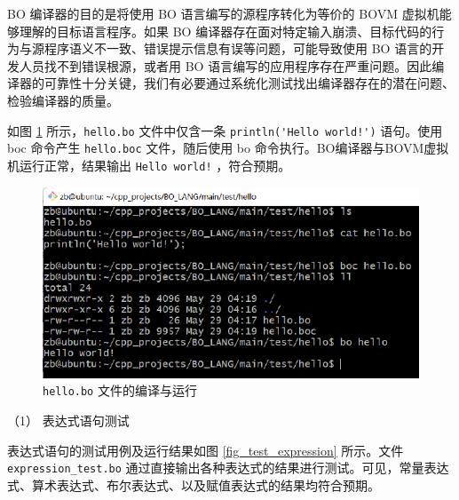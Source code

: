 \newcommand{\nterm}[1]{#1}
\newcommand{\term}[1]{#1}
\newcommand{\filename}[1]{\mbox{\texttt{#1}}}


BO 编译器的目的是将使用 BO 语言编写的源程序转化为等价的 BOVM 虚拟机能够理解的目标语言程序。如果 BO 编译器存在面对特定输入崩溃、目标代码的行为与源程序语义不一致、错误提示信息有误等问题，可能导致使用 BO 语言的开发人员找不到错误根源，或者用 BO 语言编写的应用程序存在严重问题。因此编译器的可靠性十分关键，我们有必要通过系统化测试找出编译器存在的潜在问题、检验编译器的质量\cite{emark2012}。

如图 \ref{fig_test_hello} 所示，\filename{hello.bo} 文件中仅含一条 \verb|println('Hello world!')| 语句。使用 boc 命令产生 \filename{hello.boc} 文件，随后使用 bo 命令执行。BO编译器与BOVM虚拟机运行正常，结果输出 \verb|Hello world!| ，符合预期。
\begin{figure}[H]
    \centering\includegraphics[]{figure/test_hello.pdf}
    \caption{\filename{hello.bo} 文件的编译与运行}
    \label{fig_test_hello}
\end{figure}


（1） 表达式语句测试

表达式语句的测试用例及运行结果如图 \ref{fig_test_expression} 所示。文件 \filename{expression\_test.bo} 通过直接输出各种表达式的结果进行测试。可见，常量表达式、算术表达式、布尔表达式、以及赋值表达式的结果均符合预期。

